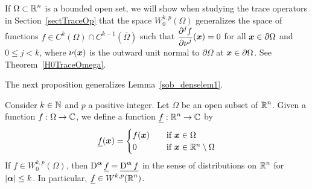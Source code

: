 If $\displaystyle \Omega \subset \mathbb{R}^n$ is a bounded open set, we will
show when studying the trace operators in Section~\ref{sectTraceOp}
that the space $\displaystyle W^{k,p}_0(\Omega)$ generalizes the space
of functions $\displaystyle f \in C^k(\Omega) \cap C^{k-1}(\overline{\Omega})$
such that $\displaystyle \frac{\displaystyle \partial^{j}{f}} {\displaystyle \partial \nu^{j}}({\bm{x}}) = 0$ for all
${\bm{x}} \in \partial \Omega$ and $0 \leq j <k$, where
$\nu({\bm{x}})$ is the outward unit normal to $\partial \Omega$
at ${\bm{x}} \in \partial \Omega$.  See Theorem~\ref{H0TraceOmega}.

The next proposition generalizes Lemma~\ref{sob_denselem1}.

\begin{prop} \label{sob_expand_WKP}
Consider $k\in \mathbb{N}$ and $p$ a positive integer.  Let $\Omega$ be an
open subset of $\displaystyle \mathbb{R}^n$.  Given a function
$f:\Omega \rightarrow \mathbb{C}$,
we define a function $\displaystyle \underline{f}:\mathbb{R}^n\rightarrow \mathbb{C}$ by
\[
\underline{f}({\bm{x}}) =
\begin{cases}
f({\bm{x}}) & \quad \text{if} \ {\bm{x}} \in \Omega \\
0 & \quad \text{if} \ {\bm{x}} \in \mathbb{R}^n \setminus \Omega
\end{cases}
\]
If $\displaystyle f \in W^{k,p}_0(\Omega)$, then
$\displaystyle \operatorname{D}^{{\bm{\alpha}}} \underline{f}
= \underline{\operatorname{D}^{{\bm{\alpha}}} f}$
in the sense of distributions on $\displaystyle \mathbb{R}^n$ for
$|{\bm{\alpha}}|\leq k$.  In particular,
$\displaystyle \underline{f} \in W^{k,p}(\mathbb{R}^n)$.
\end{prop}

